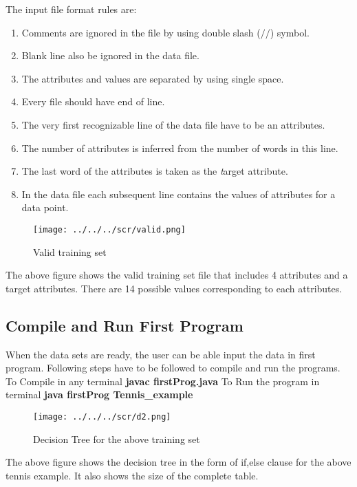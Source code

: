 \documentclass{article}
\begin{document}
The input file format rules are:
\begin{enumerate}

\item Comments are ignored in the file by using double slash ($//$) symbol. 
\item Blank line also be ignored in the data file.
\item The attributes and values are separated by using single space.
\item Every file should have end of line.
\item The very first recognizable line of the data file have to be an attributes.
\item The number of attributes is inferred from the number of words in this line.
\item The last word of the attributes is taken as the {\emph target attribute. }
\item In the data file each subsequent line contains the values of attributes for a data point.
\end{enumerate}

\pagebreak

\begin{figure}[hbtp]
\centering
\texttt{[image: ../../../scr/valid.png]}
\caption{Valid training set}
\end{figure}

The above figure shows the valid training set file that includes 4 attributes and a target attributes. There are 14 possible values corresponding to each attributes.

\pagebreak

\subsection{Compile and Run First Program}
\label{sec: comp}

When the data sets are ready, the user can be able input the data in first program. 
Following steps have to be followed to compile and run the programs.
To Compile in any terminal {\bf javac firstProg.java}
To Run the program in terminal  {\bf java firstProg Tennis\_example}

\begin{figure}[hbtp]
\centering
\texttt{[image: ../../../scr/d2.png]}
\caption{Decision Tree for the above training set}
\end{figure}

The above figure shows the decision tree in the form of if,else clause for the above tennis example. It also shows the size of the complete table.
\end{document}
